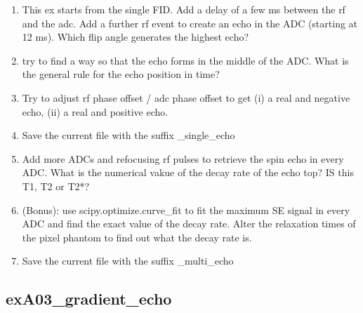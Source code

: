 \documentclass[a4paper,12pt]{extarticle}
\begin{document}
\begin{enumerate}
\item  	This ex starts from the single FID. Add a delay of a few ms between the rf and the adc.
		Add a further rf event to create an echo in the ADC (starting at 12 ms). Which flip angle generates the highest echo?
\item  	try to find a way so that the echo forms in the middle of the ADC. What is the general rule for the echo position in time?
\item  	Try to adjust rf phase offset / adc phase offset to get (i) a real and negative echo, (ii) a real and positive echo.

\item Save the current file with the suffix \_single\_echo

\item  	Add more ADCs and refocusing rf pulses to retrieve the spin echo in every ADC. What is the numerical vakue of the decay rate of the echo top?  IS this T1, T2  or T2*?

\item	(Bonus): use scipy.optimize.curve\_fit to fit the maximum SE signal in every ADC and find the exact value of the decay rate. Alter the relaxation times of the pixel phantom to find out what the decay rate is.

\item Save the current file with the suffix \_multi\_echo

\end{enumerate}

\subsection{exA03\_gradient\_echo}
\end{document}

